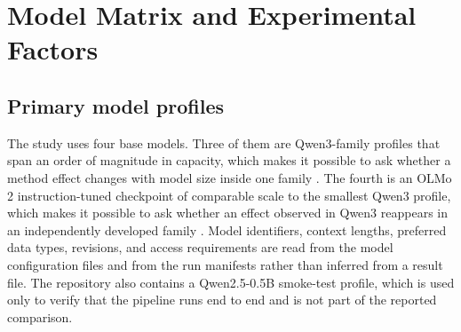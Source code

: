 \section{Model Matrix and Experimental Factors}

\subsection{Primary model profiles}

The study uses four base models. Three of them are Qwen3-family profiles that span an order of magnitude in capacity, which makes it possible to ask whether a method effect changes with model size inside one family \cite{yang2025qwen3,qwen2026qwen38}. The fourth is an OLMo 2 instruction-tuned checkpoint of comparable scale to the smallest Qwen3 profile, which makes it possible to ask whether an effect observed in Qwen3 reappears in an independently developed family \cite{olmo2025furious}. Model identifiers, context lengths, preferred data types, revisions, and access requirements are read from the model configuration files and from the run manifests rather than inferred from a result file. The repository also contains a Qwen2.5-0.5B smoke-test profile, which is used only to verify that the pipeline runs end to end and is not part of the reported comparison.

